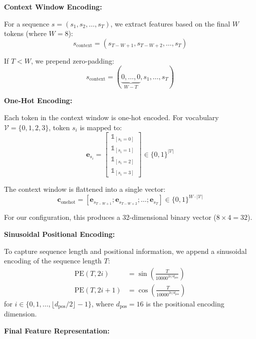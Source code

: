 \documentclass[conference]{IEEEtran}
\begin{document}
\textbf{Context Window Encoding:}

For a sequence $s = (s_1, s_2, \ldots, s_T)$, we extract features based on the final $W$ tokens (where $W = 8$):
\begin{equation}
s_{\text{context}} = (s_{T-W+1}, s_{T-W+2}, \ldots, s_T)
\end{equation}

If $T < W$, we prepend zero-padding:
\begin{equation}
s_{\text{context}} = (\underbrace{0, \ldots, 0}_{W-T}, s_1, \ldots, s_T)
\end{equation}

\textbf{One-Hot Encoding:}

Each token in the context window is one-hot encoded. For vocabulary $\mathcal{V} = \{0, 1, 2, 3\}$, token $s_i$ is mapped to:
\begin{equation}
\mathbf{e}_{s_i} = \begin{bmatrix} \mathbb{1}_{[s_i = 0]} \\ \mathbb{1}_{[s_i = 1]} \\ \mathbb{1}_{[s_i = 2]} \\ \mathbb{1}_{[s_i = 3]} \end{bmatrix} \in \{0, 1\}^{|\mathcal{V}|}
\end{equation}

The context window is flattened into a single vector:
\begin{equation}
\mathbf{c}_{\text{onehot}} = [\mathbf{e}_{s_{T-W+1}}; \mathbf{e}_{s_{T-W+2}}; \ldots; \mathbf{e}_{s_T}] \in \{0, 1\}^{W \cdot |\mathcal{V}|}
\end{equation}

For our configuration, this produces a 32-dimensional binary vector ($8 \times 4 = 32$).

\textbf{Sinusoidal Positional Encoding:}

To capture sequence length and positional information, we append a sinusoidal encoding of the sequence length $T$:
\begin{align}
\text{PE}(T, 2i) &= \sin\left(\frac{T}{10000^{2i/d_{\text{pos}}}}\right) \\
\text{PE}(T, 2i+1) &= \cos\left(\frac{T}{10000^{2i/d_{\text{pos}}}}\right)
\end{align}
for $i \in \{0, 1, \ldots, \lfloor d_{\text{pos}}/2 \rfloor - 1\}$, where $d_{\text{pos}} = 16$ is the positional encoding dimension.

\textbf{Final Feature Representation:}
\end{document}
